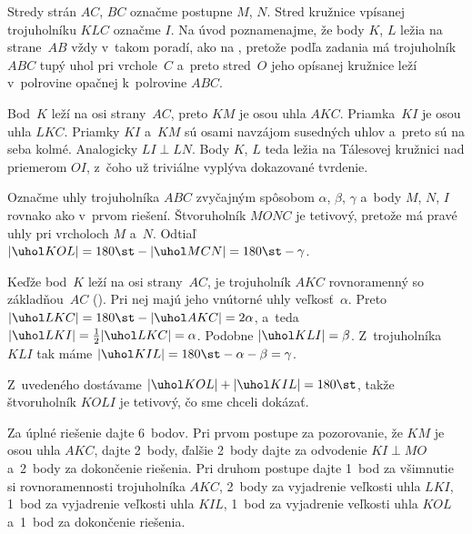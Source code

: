 {%
Stredy strán $AC$, $BC$ označme postupne $M$, $N$. Stred kružnice vpísanej trojuholníku $KLC$ označme $I$. Na úvod poznamenajme, že body $K$, $L$ ležia na strane~$AB$ vždy v~takom poradí, ako na \obr, pretože podľa zadania má trojuholník $ABC$ tupý uhol pri vrchole~$C$ a~preto stred~$O$ jeho opísanej kružnice leží v~polrovine opačnej k~polrovine $ABC$.
%

Bod~$K$ leží na osi strany~$AC$, preto $KM$ je osou uhla $AKC$. Priamka~$KI$ je osou uhla $LKC$. Priamky $KI$ a~$KM$ sú osami navzájom susedných uhlov a~preto sú na seba kolmé. Analogicky $LI\perp LN$. Body $K$, $L$ teda ležia na Tálesovej kružnici nad priemerom $OI$, z~čoho už triviálne vyplýva dokazované tvrdenie.

\ineriesenie
Označme uhly trojuholníka $ABC$ zvyčajným spôsobom $\alpha$, $\beta$, $\gamma$ a~body $M$, $N$, $I$ rovnako ako v~prvom riešení. Štvoruholník $MONC$ je tetivový, pretože má pravé uhly pri vrcholoch $M$ a~$N$. Odtiaľ $|\uhol KOL|=180\st-|\uhol MCN|=180\st-\gamma$.

Keďže bod~$K$ leží na osi strany~$AC$, je trojuholník $AKC$ rovnoramenný so základňou~$AC$ (\obr). Pri nej majú jeho vnútorné uhly veľkosť~$\alpha$. Preto $|\uhol LKC|=180\st-|\uhol AKC|=2\alpha$, a~teda $|\uhol LKI|=\frac12|\uhol LKC|=\alpha$. Podobne $|\uhol KLI|=\beta$. Z~trojuholníka $KLI$ tak máme $|\uhol KIL|=180\st-\alpha-\beta=\gamma$.
%

Z~uvedeného dostávame $|\uhol KOL|+|\uhol KIL|=180\st$, takže štvoruholník $KOLI$ je tetivový, čo sme chceli dokázať.

\nobreak\medskip\petit\noindent
Za úplné riešenie dajte 6~bodov. Pri prvom postupe za pozorovanie, že $KM$ je osou uhla $AKC$, dajte 2~body, ďalšie 2~body dajte za odvodenie $KI\perp MO$ a~2~body za dokončenie riešenia. Pri druhom postupe dajte 1~bod za všimnutie si rovnoramennosti trojuholníka $AKC$, 2~body za vyjadrenie veľkosti uhla $LKI$, 1~bod za vyjadrenie veľkosti uhla $KIL$, 1~bod za vyjadrenie veľkosti uhla $KOL$ a~1~bod za dokončenie riešenia.
\endpetit
\bigbreak
}

